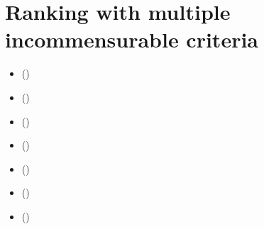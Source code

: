 \documentclass[a4paper,12pt,english]{sphinxhowto}
\begin{document}
\section{Ranking with multiple incommensurable criteria}
\label{\detokenize{tutorial:ranking-with-multiple-incommensurable-criteria}}\label{\detokenize{tutorial:ranking-tutorial-label}}
\begin{sphinxShadowBox}
\begin{itemize}
\item {} 
\label{\detokenize{tutorial:id263}}{\hyperref[\detokenize{tutorial:the-ranking-problem}]{}} ()

\item {} 
\label{\detokenize{tutorial:id264}}{\hyperref[\detokenize{tutorial:the-copeland-ranking}]{}} ()

\item {} 
\label{\detokenize{tutorial:id265}}{\hyperref[\detokenize{tutorial:the-netflows-ranking}]{}} ()

\item {} 
\label{\detokenize{tutorial:id266}}{\hyperref[\detokenize{tutorial:kemeny-rankings}]{}} ()

\item {} 
\label{\detokenize{tutorial:id267}}{\hyperref[\detokenize{tutorial:slater-rankings}]{}} ()

\item {} 
\label{\detokenize{tutorial:id268}}{\hyperref[\detokenize{tutorial:kohler-s-ranking-by-choosing-rule}]{}} ()

\item {} 
\label{\detokenize{tutorial:id269}}{\hyperref[\detokenize{tutorial:tideman-s-ranked-pairs-rule}]{}} ()

\end{itemize}
\end{sphinxShadowBox}
\end{document}
